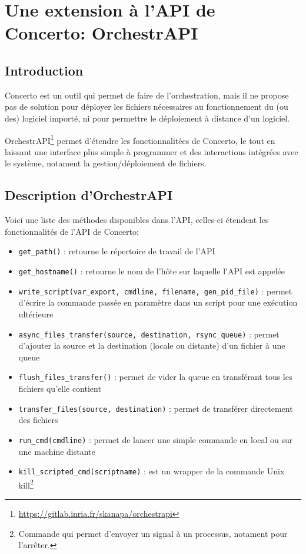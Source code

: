 \documentclass{article}
\newcommand{\api}{API\xspace}
\newcommand{\concerto}{Concerto\xspace}
\newcommand{\orchestrapi}{OrchestrAPI\xspace}
\begin{document}
\section{Une extension à l'\api de \concerto : \orchestrapi}\label{section:orchestrapi}
\subsection{Introduction} %
\concerto est un outil qui permet de faire de l'orchestration, mais il ne
propose pas de solution pour déployer les fichiers nécessaires au fonctionnement
du (ou des) logiciel importé, ni pour permettre le déploiement à distance d'un
logiciel.

\orchestrapi\footnote{\url{https://gitlab.inria.fr/skanapa/orchestrapi}} permet
d'étendre les fonctionnalitées de \concerto, le tout en laissant une interface
plus simple à programmer et des interactions intégrées avec le système, notament
la gestion/déploiement de fichiers.


\subsection{Description d'\orchestrapi}
Voici une liste des méthodes disponibles dans l'\api, celles-ci étendent les
fonctionnalités de l'\api de \concerto :
\begin{itemize}
	\item \texttt{get\_path()} : retourne le répertoire de travail de l'\api

	\item \texttt{get\_hostname()} : retourne le nom de l'hôte sur laquelle
	l'\api est appelée

	\item \texttt{write\_script(var\_export, cmdline, filename, gen\_pid\_file)}
	: permet d'écrire la commande passée en paramètre dans un script pour une
	exécution ultérieure

	\item \texttt{async\_files\_transfer(source, destination, rsync\_queue)} :
	permet d'ajouter la source et la destination (locale ou distante) d'un
	fichier à une queue

	\item \texttt{flush\_files\_transfer()} : permet de vider la queue en
	transférant tous les fichiers qu'elle contient

	\item \texttt{transfer\_files(source, destination)} : permet de transférer
	directement des fichiers

	\item \texttt{run\_cmd(cmdline)} : permet de lancer une simple commande en
	local ou sur une machine distante

	\item \texttt{kill\_scripted\_cmd(scriptname)} : est un \og wrapper \fg de la
	commande Unix \og kill\footnote{Commande qui permet d'envoyer un signal à un
	processus, notament pour l'arrêter.} \fg

\end{itemize}
\end{document}

